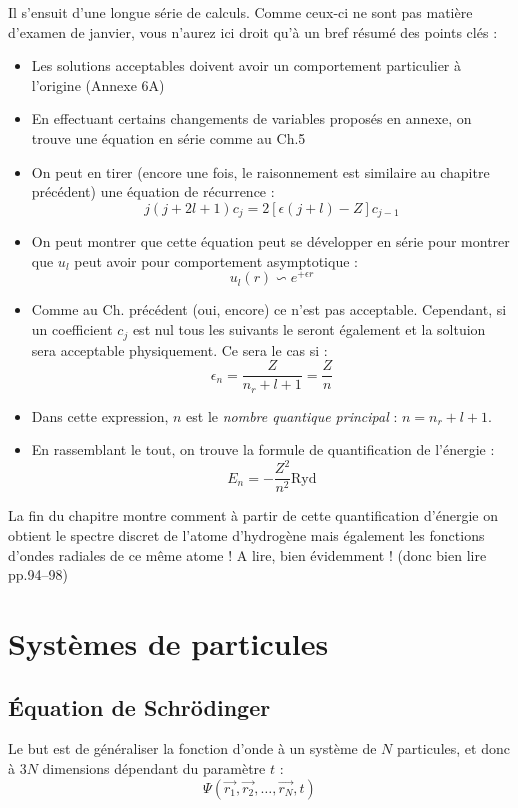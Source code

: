 \documentclass[british,french,11pt, a4paper, openany]{book}
\begin{document}
Il s'ensuit d'une longue série de calculs. Comme ceux-ci ne sont pas matière d'examen de janvier, vous n'aurez ici droit qu'à un bref résumé des points clés :
\begin{itemize}
	\item Les solutions acceptables doivent avoir un comportement particulier à l’origine (Annexe 6A)
	\item En effectuant certains changements de variables proposés en annexe, on trouve une équation en série comme au Ch.5
	\item On peut en tirer (encore une fois, le raisonnement est similaire au chapitre précédent) une équation de récurrence :
	\begin{equation}
		j(j+2l+1)c_j = 2[\epsilon(j+l) - Z]c_{j-1}
	\end{equation}
	\item On peut montrer que cette équation peut se développer en série pour montrer que $u_l$ peut avoir pour comportement asymptotique : 
	\begin{equation}
		u_l(r) \backsim e^{+\epsilon r}
	\end{equation}
	\item Comme au Ch. précédent (oui, encore) ce n'est pas acceptable. Cependant, si un coefficient $c_j$ est nul tous les suivants le seront également et la soltuion sera acceptable physiquement. Ce sera le cas si :
	\begin{equation}
		\epsilon_n = \frac{Z}{n_r + l + 1} = \frac{Z}{n}
	\end{equation}
	\item Dans cette expression, $n$ est le \textit{nombre quantique principal} : $n = n_r + l + 1$.
	\item En rassemblant le tout, on trouve la formule de quantification de l'énergie :
	\begin{equation}
		E_n = -\frac{Z^2}{n^2} \text{Ryd}
	\end{equation}
\end{itemize}
La fin du chapitre montre comment à partir de cette quantification d'énergie on obtient le spectre discret de l'atome d'hydrogène mais également les fonctions d'ondes radiales de ce même atome ! A lire, bien évidemment ! (donc bien lire pp.94--98)



\chapter{Systèmes de particules}
\section{Équation de Schrödinger}
Le but est de généraliser la fonction d'onde à un système de $N$ particules, et donc à $3N$ dimensions dépendant du paramètre $t$ :
\begin{equation}
	\Psi(\vec{r_1}, \vec{r_2}, \dots, \vec{r_N}, t)
\end{equation}
\end{document}
